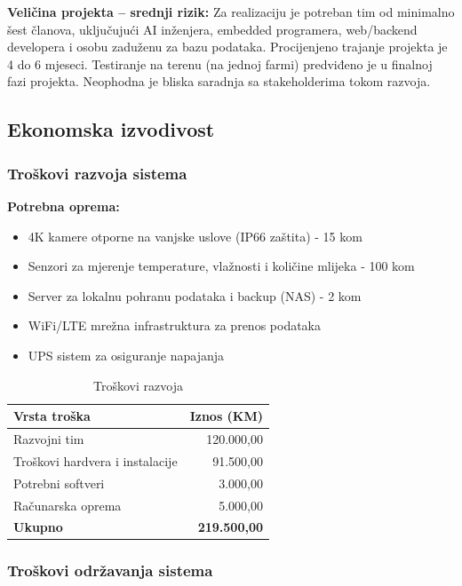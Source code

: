 \documentclass{article}
\begin{document}
\noindent
\textbf{Veličina projekta – srednji rizik:}  
Za realizaciju je potreban tim od minimalno šest članova, uključujući AI inženjera, embedded programera, web/backend developera i osobu zaduženu za bazu podataka. Procijenjeno trajanje projekta je 4 do 6 mjeseci. Testiranje na terenu (na jednoj farmi) predviđeno je u finalnoj fazi projekta. Neophodna je bliska saradnja sa stakeholderima tokom razvoja.\\


\subsection{Ekonomska izvodivost}

\subsubsection{Troškovi razvoja sistema}

\textbf{Potrebna oprema:}
\begin{itemize}
  \item 4K kamere otporne na vanjske uslove (IP66 zaštita) - 15 kom
  \item Senzori za mjerenje temperature, vlažnosti i količine mlijeka - 100 kom
  \item Server za lokalnu pohranu podataka i backup (NAS) - 2 kom
  \item WiFi/LTE mrežna infrastruktura za prenos podataka
  \item UPS sistem za osiguranje napajanja
\end{itemize}

\begin{table}[h]
\centering
\caption{Troškovi razvoja}
\begin{tabular}{|l|r|}
\hline
\textbf{Vrsta troška} & \textbf{Iznos (KM)} \\ \hline
Razvojni tim & 120.000,00 \\ \hline
Troškovi hardvera i instalacije & 91.500,00 \\ \hline
Potrebni softveri & 3.000,00 \\ \hline
Računarska oprema & 5.000,00 \\ \hline
\textbf{Ukupno} & \textbf{219.500,00} \\ \hline
\end{tabular}
\end{table}

\subsubsection{Troškovi održavanja sistema}
\end{document}
